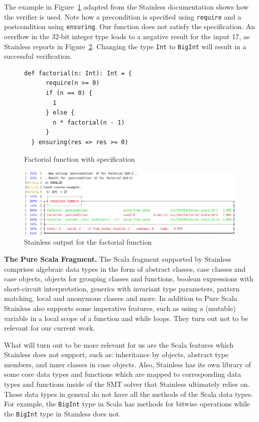 \documentclass[hyphens, a4paper,USenglish,cleveref, autoref, thm-restate]{oasics-v2019}
\renewcommand{\paragraph}{\textbf}%
\begin{document}
The example in Figure~\ref{fig:factorial} adapted from the Stainless
documentation \cite{Stainless:documentation} shows how the verifier is
used. Note how a precondition is specified using \texttt{require} and
a postcondition using \texttt{ensuring}. Our function does not satisfy
the specification. An overflow in the 32-bit integer type leads to a
negative result for the input 17, as Stainless reports in
Figure~\ref{fig:failed}. Changing the type \texttt{Int} to
\texttt{BigInt} will result in a successful verification.


\begin{figure}
\begin{lstlisting}[style=scala]
  def factorial(n: Int): Int = {
      require(n >= 0)
      if (n == 0) {
        1
      } else {
        n * factorial(n - 1)
      }
  } ensuring(res => res >= 0)
\end{lstlisting}
	\caption{Factorial function with specification}
	\label{fig:factorial}
\end{figure}

\begin{figure}
	\centering
		\includegraphics[width=\textwidth]{output1.png}
	\caption{Stainless output for the factorial function}
	\label{fig:failed}
\end{figure}


\paragraph{The Pure Scala Fragment.} The Scala fragment supported by
Stainless comprises algebraic data types in the form of abstract
classes, case classes and case objects, objects for grouping classes
and functions, boolean expressions with short-circuit interpretation,
generics with invariant type parameters, pattern matching, local and
anonymous classes and more.  In addition to Pure Scala Stainless also
supports some imperative features, such as using a (mutable) variable
in a local scope of a function and while loops. They turn out not to
be relevant for our current work.

What will turn out to be more relevant for us are the Scala features
which Stainless does not support, such as: inheritance by objects,
abstract type members, and inner classes in case objects. Also,
Stainless has its own library of some core data types and functions
which are mapped to corresponding data types and functions inside of
the SMT solver that Stainless ultimately relies on. Those data types
in general do not have all the methods of the Scala data types. For
example, the \texttt{BigInt} type in Scala has methods for bitwise
operations while the \texttt{BigInt} type in Stainless does not.
\end{document}
